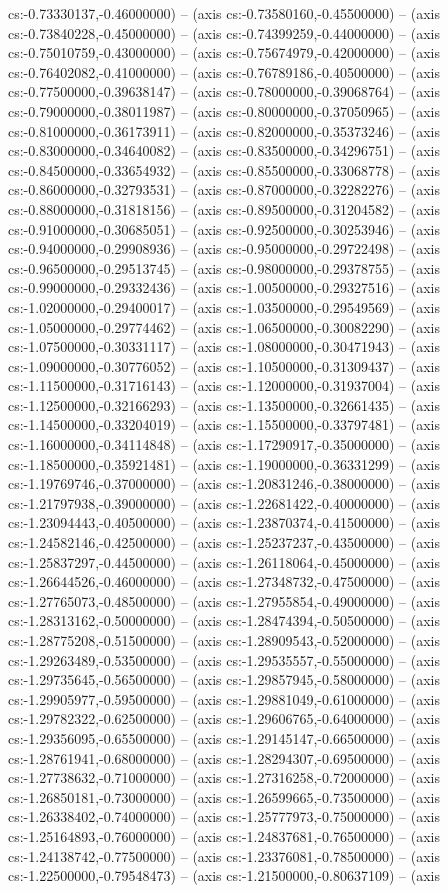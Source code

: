 cs:-0.73330137,-0.46000000) -- (axis cs:-0.73580160,-0.45500000) -- (axis cs:-0.73840228,-0.45000000) -- (axis cs:-0.74399259,-0.44000000) -- (axis cs:-0.75010759,-0.43000000) -- (axis cs:-0.75674979,-0.42000000) -- (axis cs:-0.76402082,-0.41000000) -- (axis cs:-0.76789186,-0.40500000) -- (axis cs:-0.77500000,-0.39638147) -- (axis cs:-0.78000000,-0.39068764) -- (axis cs:-0.79000000,-0.38011987) -- (axis cs:-0.80000000,-0.37050965) -- (axis cs:-0.81000000,-0.36173911) -- (axis cs:-0.82000000,-0.35373246) -- (axis cs:-0.83000000,-0.34640082) -- (axis cs:-0.83500000,-0.34296751) -- (axis cs:-0.84500000,-0.33654932) -- (axis cs:-0.85500000,-0.33068778) -- (axis cs:-0.86000000,-0.32793531) -- (axis cs:-0.87000000,-0.32282276) -- (axis cs:-0.88000000,-0.31818156) -- (axis cs:-0.89500000,-0.31204582) -- (axis cs:-0.91000000,-0.30685051) -- (axis cs:-0.92500000,-0.30253946) -- (axis cs:-0.94000000,-0.29908936) -- (axis cs:-0.95000000,-0.29722498) -- (axis cs:-0.96500000,-0.29513745) -- (axis cs:-0.98000000,-0.29378755) -- (axis cs:-0.99000000,-0.29332436) -- (axis cs:-1.00500000,-0.29327516) -- (axis cs:-1.02000000,-0.29400017) -- (axis cs:-1.03500000,-0.29549569) -- (axis cs:-1.05000000,-0.29774462) -- (axis cs:-1.06500000,-0.30082290) -- (axis cs:-1.07500000,-0.30331117) -- (axis cs:-1.08000000,-0.30471943) -- (axis cs:-1.09000000,-0.30776052) -- (axis cs:-1.10500000,-0.31309437) -- (axis cs:-1.11500000,-0.31716143) -- (axis cs:-1.12000000,-0.31937004) -- (axis cs:-1.12500000,-0.32166293) -- (axis cs:-1.13500000,-0.32661435) -- (axis cs:-1.14500000,-0.33204019) -- (axis cs:-1.15500000,-0.33797481) -- (axis cs:-1.16000000,-0.34114848) -- (axis cs:-1.17290917,-0.35000000) -- (axis cs:-1.18500000,-0.35921481) -- (axis cs:-1.19000000,-0.36331299) -- (axis cs:-1.19769746,-0.37000000) -- (axis cs:-1.20831246,-0.38000000) -- (axis cs:-1.21797938,-0.39000000) -- (axis cs:-1.22681422,-0.40000000) -- (axis cs:-1.23094443,-0.40500000) -- (axis cs:-1.23870374,-0.41500000) -- (axis cs:-1.24582146,-0.42500000) -- (axis cs:-1.25237237,-0.43500000) -- (axis cs:-1.25837297,-0.44500000) -- (axis cs:-1.26118064,-0.45000000) -- (axis cs:-1.26644526,-0.46000000) -- (axis cs:-1.27348732,-0.47500000) -- (axis cs:-1.27765073,-0.48500000) -- (axis cs:-1.27955854,-0.49000000) -- (axis cs:-1.28313162,-0.50000000) -- (axis cs:-1.28474394,-0.50500000) -- (axis cs:-1.28775208,-0.51500000) -- (axis cs:-1.28909543,-0.52000000) -- (axis cs:-1.29263489,-0.53500000) -- (axis cs:-1.29535557,-0.55000000) -- (axis cs:-1.29735645,-0.56500000) -- (axis cs:-1.29857945,-0.58000000) -- (axis cs:-1.29905977,-0.59500000) -- (axis cs:-1.29881049,-0.61000000) -- (axis cs:-1.29782322,-0.62500000) -- (axis cs:-1.29606765,-0.64000000) -- (axis cs:-1.29356095,-0.65500000) -- (axis cs:-1.29145147,-0.66500000) -- (axis cs:-1.28761941,-0.68000000) -- (axis cs:-1.28294307,-0.69500000) -- (axis cs:-1.27738632,-0.71000000) -- (axis cs:-1.27316258,-0.72000000) -- (axis cs:-1.26850181,-0.73000000) -- (axis cs:-1.26599665,-0.73500000) -- (axis cs:-1.26338402,-0.74000000) -- (axis cs:-1.25777973,-0.75000000) -- (axis cs:-1.25164893,-0.76000000) -- (axis cs:-1.24837681,-0.76500000) -- (axis cs:-1.24138742,-0.77500000) -- (axis cs:-1.23376081,-0.78500000) -- (axis cs:-1.22500000,-0.79548473) -- (axis cs:-1.21500000,-0.80637109) -- (axis 